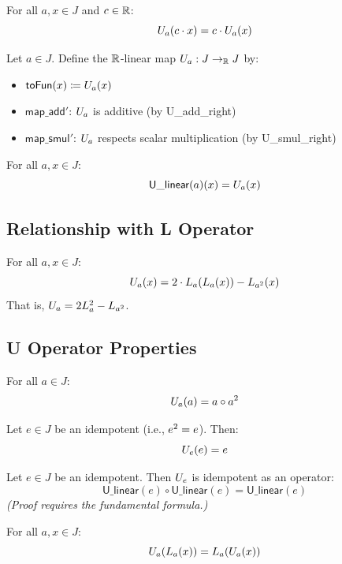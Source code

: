 \begin{theorem}
For all $a, x \in J$ and $c \in \mathbb{R}$:
\[ U_{a}(c \cdot x) = c \cdot U_{a}(x) \]
\end{theorem}

\begin{definition}[U\_linear]
Let $a \in J$. Define the $\mathbb{R}$-linear map $U_{a} : J \to_{\mathbb{R}} J$ by:
\begin{itemize}
  \item $\mathsf{toFun}(x) \coloneqq U_{a}(x)$
  \item $\mathsf{map\_add'}$: $U_{a}$ is additive (by U\_add\_right)
  \item $\mathsf{map\_smul'}$: $U_{a}$ respects scalar multiplication (by U\_smul\_right)
\end{itemize}
\end{definition}

\begin{theorem}
For all $a, x \in J$:
\[ \mathsf{U\_linear}(a)(x) = U_{a}(x) \]
\end{theorem}

\subsection{Relationship with L Operator}

\begin{theorem}[U\_eq\_L]
For all $a, x \in J$:
\[ U_{a}(x) = 2 \cdot L_{a}(L_{a}(x)) - L_{a^{2}}(x) \]
That is, $U_{a} = 2L_{a}^2 - L_{a^{2}}$.
\end{theorem}

\subsection{U Operator Properties}

\begin{theorem}[U\_self]
For all $a \in J$:
\[ U_{a}(a) = a \circ a^{2} \]
\end{theorem}

\begin{theorem}
Let $e \in J$ be an idempotent (i.e., $e^{2} = e$). Then:
\[ U_{e}(e) = e \]
\end{theorem}

\begin{theorem}
Let $e \in J$ be an idempotent. Then $U_{e}$ is idempotent as an operator:
\[ \mathsf{U\_linear}(e) \circ \mathsf{U\_linear}(e) = \mathsf{U\_linear}(e) \]
\textit{(Proof requires the fundamental formula.)}
\end{theorem}

\begin{theorem}[U\_L\_comm]
For all $a, x \in J$:
\[ U_{a}(L_{a}(x)) = L_{a}(U_{a}(x)) \]
\end{theorem}
